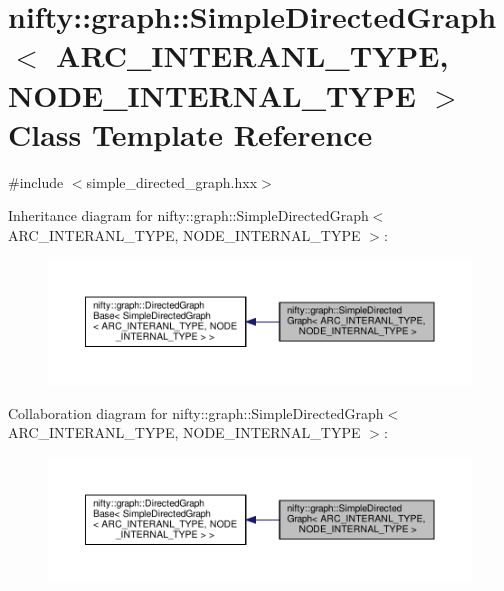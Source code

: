 \hypertarget{classnifty_1_1graph_1_1SimpleDirectedGraph}{}\section{nifty\+:\+:graph\+:\+:Simple\+Directed\+Graph$<$ A\+R\+C\+\_\+\+I\+N\+T\+E\+R\+A\+N\+L\+\_\+\+T\+Y\+PE, N\+O\+D\+E\+\_\+\+I\+N\+T\+E\+R\+N\+A\+L\+\_\+\+T\+Y\+PE $>$ Class Template Reference}
\label{classnifty_1_1graph_1_1SimpleDirectedGraph}


{\ttfamily \#include $<$simple\+\_\+directed\+\_\+graph.\+hxx$>$}



Inheritance diagram for nifty\+:\+:graph\+:\+:Simple\+Directed\+Graph$<$ A\+R\+C\+\_\+\+I\+N\+T\+E\+R\+A\+N\+L\+\_\+\+T\+Y\+PE, N\+O\+D\+E\+\_\+\+I\+N\+T\+E\+R\+N\+A\+L\+\_\+\+T\+Y\+PE $>$\+:
\nopagebreak
\begin{figure}[H]
\begin{center}
\leavevmode
\includegraphics[width=350pt]{classnifty_1_1graph_1_1SimpleDirectedGraph__inherit__graph}
\end{center}
\end{figure}


Collaboration diagram for nifty\+:\+:graph\+:\+:Simple\+Directed\+Graph$<$ A\+R\+C\+\_\+\+I\+N\+T\+E\+R\+A\+N\+L\+\_\+\+T\+Y\+PE, N\+O\+D\+E\+\_\+\+I\+N\+T\+E\+R\+N\+A\+L\+\_\+\+T\+Y\+PE $>$\+:
\nopagebreak
\begin{figure}[H]
\begin{center}
\leavevmode
\includegraphics[width=350pt]{classnifty_1_1graph_1_1SimpleDirectedGraph__coll__graph}
\end{center}
\end{figure}
